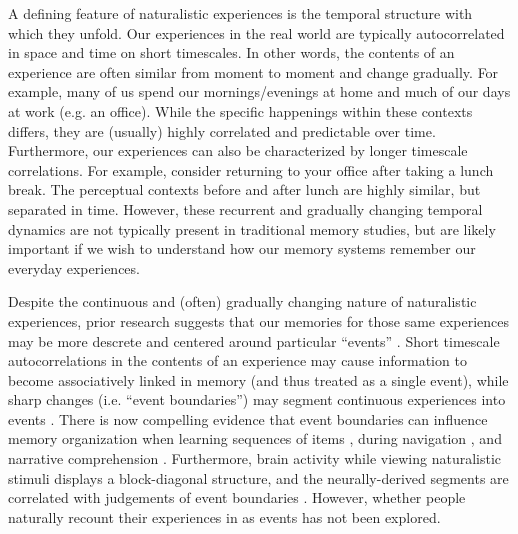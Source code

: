 \documentclass{article}
\begin{document}
{A defining feature of naturalistic experiences is the temporal structure with which they unfold. Our experiences in the real world are typically autocorrelated in space and time on short timescales. In other words, the contents of an experience are often similar from moment to moment and change gradually. For example, many of us spend our mornings/evenings at home and much of our days at work (e.g. an office). While the specific happenings within these contexts differs, they are (usually) highly correlated and predictable over time. Furthermore, our experiences can also be characterized by longer timescale correlations. For example, consider returning to your office after taking a lunch break. The perceptual contexts before and after lunch are highly similar, but separated in time. However, these recurrent and gradually changing temporal dynamics are not typically present in traditional memory studies, but are likely important if we wish to understand how our memory systems remember our everyday experiences.

Despite the continuous and (often) gradually changing nature of naturalistic experiences, prior research suggests that our memories for those same experiences may be more descrete and centered around particular ``events'' \citep{Radv12, RadvZack11, BrunEtal18}. Short timescale autocorrelations in the contents of an experience may cause information to become associatively linked in memory (and thus treated as a single event), while sharp changes (i.e. ``event boundaries'') may segment continuous experiences into events \citep{HeusEtal18, BrunEtal18, Radv12}. There is now compelling evidence that event boundaries can influence memory organization when learning sequences of items \citep{HeusEtal18, DuBrDava13}, during navigation \citep{BrunEtal18}, and narrative comprehension \citep{ZwaaRadv98, EzzyDava11}.  Furthermore, brain activity while viewing naturalistic stimuli displays a block-diagonal structure, and the neurally-derived segments are correlated with judgements of event boundaries \citep{BaldEtal17}.  However, whether people naturally recount their experiences in as events has not been explored.

%

}
\end{document}
